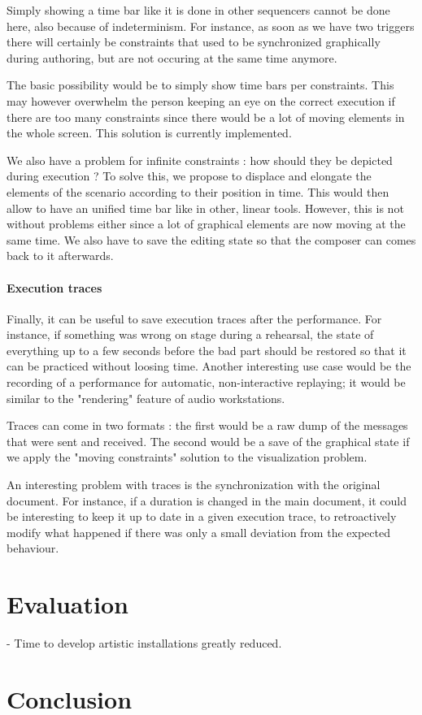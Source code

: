 \documentclass{sigchi}
\begin{document}
Simply showing a time bar like it is done in other sequencers cannot be done here, also because of indeterminism.
For instance, as soon as we have two triggers there will certainly be constraints that used to be synchronized graphically during authoring, but are not occuring at the same time anymore.

The basic possibility would be to simply show time bars per constraints. This may however overwhelm the person keeping an eye on the correct execution if there are too many constraints since there would be a lot of moving elements in the whole screen. This solution is currently implemented.

We also have a problem for infinite constraints : how should they be depicted during execution ? To solve this, we propose to displace and elongate the elements of the scenario according to their position in time. This would then allow to have an unified time bar like in other, linear tools. However, 
this is not without problems either since a lot of graphical elements are now moving at the same time. We also have to save the editing state so that the composer can comes back to it afterwards.

\paragraph{Execution traces}
Finally, it can be useful to save execution traces after the performance. For instance, if something was wrong on stage during a rehearsal, the state of everything up to a few seconds before the bad part should be restored so that it can be practiced without loosing time.
Another interesting use case would be the recording of a performance for automatic, non-interactive replaying; it would be similar to the "rendering" feature of audio workstations.

Traces can come in two formats : the first would be a raw dump of the messages that were sent and received.
The second would be a save of the graphical state if we apply the "moving constraints" solution to the visualization problem.

An interesting problem with traces is the synchronization with the original document. For instance, if a duration is changed in the main document, it could be interesting to keep it up to date in a given execution trace, to retroactively modify what happened if there was only a small deviation from the expected behaviour.


\section{Evaluation}
- Time to develop artistic installations greatly reduced.

\section{Conclusion}



\end{document}
